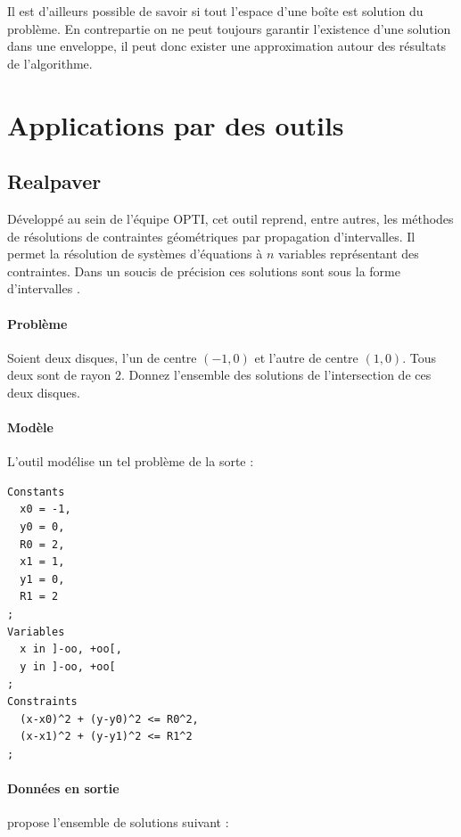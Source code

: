 
 Il est d'ailleurs possible de savoir si tout l'espace d'une boîte est solution du problème. En contrepartie on ne peut toujours garantir l'existence d'une solution dans une enveloppe, il peut donc exister une approximation autour des résultats de l'algorithme.

\clearpage
 
 \section{Applications par des outils}
\subsection{Realpaver}\label{realp}
Développé  au sein de l'équipe \textsc{OPTI}, cet outil reprend, entre autres, les méthodes de résolutions de contraintes géométriques par propagation d'intervalles. Il permet la résolution de systèmes d'équations à $n$ variables représentant des contraintes. Dans un soucis de précision ces solutions sont sous la forme d'intervalles \cite{realpaver}.%
\paragraph{Problème}
Soient deux disques, l'un de centre $(-1,0)$ et l'autre de centre $(1,0)$. Tous deux sont de rayon $2$. Donnez l'ensemble des solutions de l'intersection de ces deux disques.
\paragraph{Modèle}
L'outil \realpaver{}  modélise un tel problème de la sorte :
\label{realprob}
\begin{verbatim} 
Constants
  x0 = -1,
  y0 = 0,
  R0 = 2,
  x1 = 1,
  y1 = 0,
  R1 = 2
;
Variables
  x in ]-oo, +oo[,
  y in ]-oo, +oo[
;
Constraints
  (x-x0)^2 + (y-y0)^2 <= R0^2,
  (x-x1)^2 + (y-y1)^2 <= R1^2
;
\end{verbatim}
\paragraph{Données en sortie}\label{par:out}
\realpaver{} propose l'ensemble de solutions suivant : 

